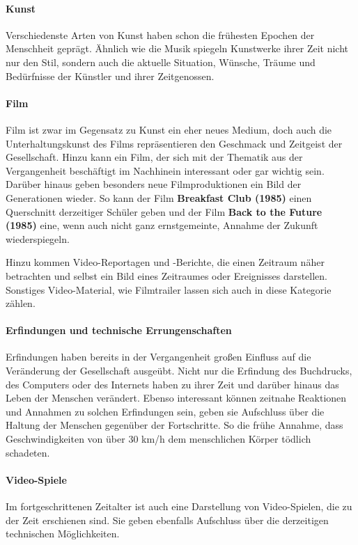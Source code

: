 \paragraph{Kunst}
Verschiedenste Arten von Kunst haben schon die frühesten Epochen der Menschheit geprägt. Ähnlich wie die Musik spiegeln Kunstwerke ihrer Zeit nicht nur den Stil, sondern auch die aktuelle Situation, Wünsche, Träume und Bedürfnisse der Künstler und ihrer Zeitgenossen.

\paragraph{Film}
Film ist zwar im Gegensatz zu Kunst ein eher neues Medium, doch auch die Unterhaltungskunst des Films repräsentieren den Geschmack und Zeitgeist der Gesellschaft. Hinzu kann ein Film, der sich mit der Thematik aus der Vergangenheit beschäftigt im Nachhinein interessant oder gar wichtig sein. Darüber hinaus geben besonders neue Filmproduktionen ein Bild der Generationen wieder. So kann \zB der Film \textbf{Breakfast Club (1985)} einen Querschnitt derzeitiger Schüler geben und der Film \textbf{Back to the Future (1985)} eine, wenn auch nicht ganz ernstgemeinte, Annahme der Zukunft wiederspiegeln. 

Hinzu kommen Video-Reportagen und -Berichte, die einen Zeitraum näher betrachten und selbst ein Bild eines Zeitraumes oder Ereignisses darstellen. Sonstiges Video-Material, wie \zB Filmtrailer lassen sich auch in diese Kategorie zählen.

\paragraph{Erfindungen und technische Errungenschaften}
Erfindungen haben bereits in der Vergangenheit großen Einfluss auf die Veränderung der Gesellschaft ausgeübt. Nicht nur die Erfindung des Buchdrucks, des Computers oder des Internets haben zu ihrer Zeit und darüber hinaus das Leben der Menschen verändert. Ebenso interessant können zeitnahe Reaktionen und Annahmen zu solchen Erfindungen sein, geben sie \uU Aufschluss über die Haltung der Menschen gegenüber der Fortschritte. So \zB die frühe Annahme, dass Geschwindigkeiten von über 30 km/h dem menschlichen Körper tödlich schadeten.

\paragraph{Video-Spiele}
Im fortgeschrittenen Zeitalter ist auch eine Darstellung von Video-Spielen, die zu der Zeit erschienen sind. Sie geben ebenfalls Aufschluss über die derzeitigen technischen Möglichkeiten.

